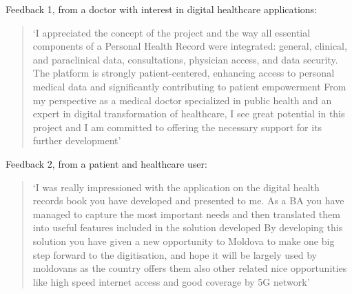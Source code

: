 Feedback 1, from a doctor with interest in digital healthcare applications:

\begin{quotation}
    `I appreciated the concept of the project and the way all essential components of a Personal Health Record were integrated: general, clinical, and paraclinical data, consultations, physician access, and data security. The platform is strongly patient-centered, enhancing access to personal medical data and significantly contributing to patient empowerment \textellipsis{} From my perspective as a medical doctor specialized in public health and an expert in digital transformation of healthcare, I see great potential in this project and I am committed to offering the necessary support for its further development'
\end{quotation}

Feedback 2, from a patient and healthcare user:

\begin{quotation}
    `I was really impressioned with the application on the digital health records book you have developed and presented to me. As a BA you have managed to capture the most important needs and then translated them into useful features included in the solution developed \textellipsis{} By developing this solution you have given a new opportunity to Moldova to make one big step forward to the digitisation, and hope it will be largely used by moldovans as the country offers them also other related nice opportunities like high speed internet access and good coverage by 5G network'
\end{quotation}